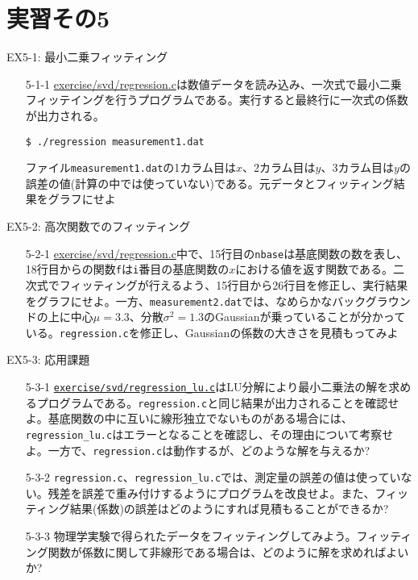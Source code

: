 \documentclass[dvipdfmx]{beamer}
\begin{document}
\section{実習その5}

\begin{frame}[t,fragile]{EX5-1: 最小二乗フィッティング}
  \begin{itemize}
  \item[5-1-1] \href{https://github.com/todo-group/computer-experiments/exercise/svd/regression.c}{exercise/svd/regression.c}は数値データを読み込み、一次式で最小二乗フィッテイングを行うプログラムである。実行すると最終行に一次式の係数が出力される。
\begin{lstlisting}
$ ./regression measurement1.dat
\end{lstlisting}
    ファイル{\tt measurement1.dat}の1カラム目は$x$、2カラム目は$y$、3カラム目は$y$の誤差の値(計算の中では使っていない)である。元データとフィッティング結果をグラフにせよ
  \end{itemize}
\end{frame}

\begin{frame}[t,fragile]{EX5-2: 高次関数でのフィッティング}
  \begin{itemize}
  \item[5-2-1] \href{https://github.com/todo-group/computer-experiments/exercise/svd/regression.c}{exercise/svd/regression.c}中で、15行目の{\tt nbase}は基底関数の数を表し、18行目からの関数{\tt f}は{\tt i}番目の基底関数の$x$における値を返す関数である。二次式でフィッティングが行えるよう、15行目から26行目を修正し、実行結果をグラフにせよ。一方、{\tt measurement2.dat}では、なめらかなバックグラウンドの上に中心$\mu=3.3$、分散$\sigma^2=1.3$のGaussianが乗っていることが分かっている。{\tt regression.c}を修正し、Gaussianの係数の大きさを見積もってみよ
  \end{itemize}
\end{frame}

\begin{frame}[t,fragile]{EX5-3: 応用課題}
  \begin{itemize}
  \item[5-3-1] \href{https://github.com/todo-group/computer-experiments/exercise/svd/regression_lu.c}{\tt exercise/svd/regression\_lu.c}はLU分解により最小二乗法の解を求めるプログラムである。{\tt regression.c}と同じ結果が出力されることを確認せよ。基底関数の中に互いに線形独立でないものがある場合には、{\tt regression\_lu.c}はエラーとなることを確認し、その理由について考察せよ。一方で、{\tt regression.c}は動作するが、どのような解を与えるか?
  \item[5-3-2] {\tt regression.c}、{\tt regression\_lu.c}では、測定量の誤差の値は使っていない。残差を誤差で重み付けするようにプログラムを改良せよ。また、フィッティング結果(係数)の誤差はどのようにすれば見積もることができるか?
  \item [5-3-3] 物理学実験で得られたデータをフィッティングしてみよう。フィッティング関数が係数に関して非線形である場合は、どのように解を求めればよいか?
  \end{itemize}
\end{frame}
\end{document}
